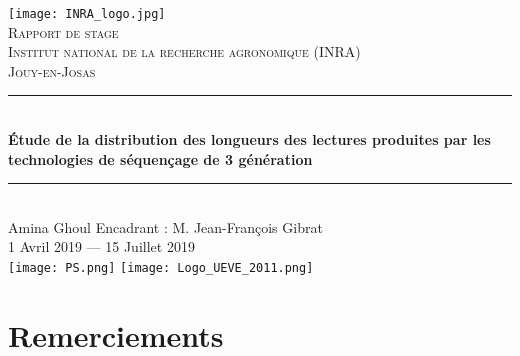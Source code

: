 \documentclass[11pt,a4paper]{article} %
\newcommand{\HRule}{\rule{\linewidth}{0.5mm}}
\begin{document}
\begin{titlepage}
  \begin{sffamily}
  \begin{center}

    \texttt{[image: INRA\_logo.jpg]}~\\[1.5cm]

    \textsc{\LARGE Rapport de stage}\\[1cm]

    \textsc{\Large Institut national de la recherche agronomique (INRA)}\\
	\textsc{ Jouy-en-Josas}\\[1cm]
    \HRule \\[0.4cm]
    {\LARGE \bfseries Étude de la distribution des longueurs des lectures  produites par les technologies de séquençage de 3\ieme{} génération\\[0.4cm] }
	
    \HRule \\[2cm]
    
        
       

    									
    

    
      {\large Amina Ghoul}
      \hspace{3cm}
      {\large Encadrant : M. Jean-François Gibrat}\\[1cm]
       
      

   

    {\large 1\ier{} Avril 2019 — 15 Juillet 2019}\\[1cm]
	\texttt{[image: PS.png]}
     \hspace{4cm}
    \texttt{[image: Logo\_UEVE\_2011.png]} \\[2cm]
  \end{center}
  \end{sffamily}
\end{titlepage}
 
     
     
\newpage
\section*{Remerciements}
\vspace{2cm}
\end{document}
